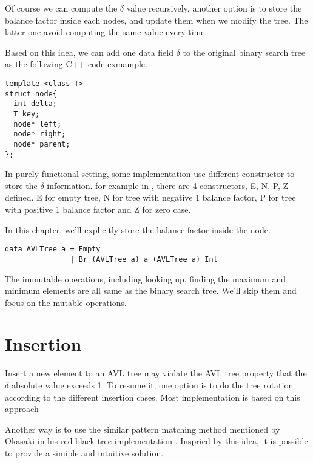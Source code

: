 \documentclass{article}
\begin{document}
Of course we can compute the $\delta$ value recursively, another option
is to store the balance factor inside each nodes, and update them
when we modify the tree. The latter one avoid computing the same value
every time.

Based on this idea, we can add one data field $\delta$ to the original
binary search tree as the following C++ code exmample.

\lstset{language=C++}
\begin{lstlisting}
template <class T>
struct node{
  int delta;
  T key;
  node* left;
  node* right;
  node* parent;
};
\end{lstlisting}

In purely functional setting, some implementation use different 
constructor to store the $\delta$ information. for example in 
\cite{hackage}, there are 4 constructors, E, N, P, Z defined.
E for empty tree, N for tree with negative 1 balance factor,
P for tree with positive 1 balance factor and Z for zero case.

In this chapter, we'll explicitly store the balance factor inside
the node.

\lstset{language=Haskell}
\begin{lstlisting}
data AVLTree a = Empty
               | Br (AVLTree a) a (AVLTree a) Int 
\end{lstlisting}

The immutable operations, including looking up, finding the maximum
and minimum elements are all same as the binary search tree. We'll
skip them and focus on the mutable operations.

\section{Insertion}

Insert a new element to an AVL tree may vialate the AVL tree property
that the $\delta$ absolute value exceeds 1. To resume it, one option
is to do the tree rotation according to the different insertion cases.
Most implementation is based on this approach

Another way is to use the similar pattern matching method mentioned by
Okasaki in his red-black tree implementation \cite{okasaki}. Inspried 
by this idea, it is possible to provide a simiple and intuitive
solution.  
\end{document}
